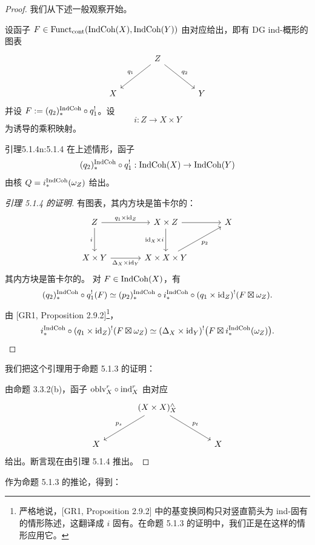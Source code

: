 \begin{proof}
我们从下述一般观察开始。

设函子 $F\in\mathrm{Funct}_{\mathrm{cont}}(\mathrm{IndCoh}(X),\mathrm{IndCoh}(Y))$ 由对应给出，即有 DG ind-概形的图表
\[
\begin{tikzcd}[column sep=large, row sep=large]
 & Z \arrow[dl, "q_1"'] \arrow[dr, "q_2"] & \\
 X & & Y
\end{tikzcd}
\]
并设 $F:=(q_2)_*^{\mathrm{IndCoh}}\circ q_1^!$。设
\[
i:Z\to X\times Y
\]
为诱导的乘积映射。

\begin{othm}{引理}{5.1.4}{n:5.1.4}
在上述情形，函子
\[
(q_2)_*^{\mathrm{IndCoh}}\circ q_1^!:\mathrm{IndCoh}(X)\to\mathrm{IndCoh}(Y)
\]
由核 $Q=i_*^{\mathrm{IndCoh}}(\omega_Z)$ 给出。
\end{othm}

\begin{proof}[引理 5.1.4 的证明]
有图表，其内方块是笛卡尔的：
\[
\begin{tikzcd}[column sep=large, row sep=large]
 Z \arrow[r, "q_1\times\mathrm{id}_Z"] \arrow[d, "i"'] & X\times Z \arrow[r] \arrow[d, "\mathrm{id}_X\times i"'] & X \\
 X\times Y \arrow[r, "\Delta_X\times\mathrm{id}_Y"'] & X\times X\times Y \arrow[ur, "p_2"'] &
\end{tikzcd}
\]
其内方块是笛卡尔的。
对 $F\in\mathrm{IndCoh}(X)$，有
\[
(q_2)_*^{\mathrm{IndCoh}}\circ q_1^!(F)\simeq(p_2)_*^{\mathrm{IndCoh}}\circ i_*^{\mathrm{IndCoh}}\circ(q_1\times\mathrm{id}_Z)^!(F\boxtimes\omega_Z).
\]
由 [GR1, Proposition 2.9.2]\footnote{严格地说，[GR1, Proposition 2.9.2] 中的基变换同构只对竖直箭头为 ind-固有的情形陈述，这翻译成 $i$ 固有。在命题 5.1.3 的证明中，我们正是在这样的情形应用它。}，
\[
i_*^{\mathrm{IndCoh}}\circ(q_1\times\mathrm{id}_Z)^!(F\boxtimes\omega_Z)\simeq(\Delta_X\times\mathrm{id}_Y)^!\big(F\boxtimes i_*^{\mathrm{IndCoh}}(\omega_Z)\big).
\]
\end{proof}

我们把这个引理用于命题 5.1.3 的证明：

由命题 3.3.2(b)，函子 $\mathrm{oblv}^r_X\circ\mathrm{ind}^r_X$ 由对应
\[
\begin{tikzcd}[column sep=large, row sep=large]
 & (X\times X)^{\wedge}_X \arrow[dl, "p_s"'] \arrow[dr, "p_t"] & \\
 X & & X
\end{tikzcd}
\]
给出。断言现在由引理 5.1.4 推出。
\end{proof}

作为命题 5.1.3 的推论，得到：

